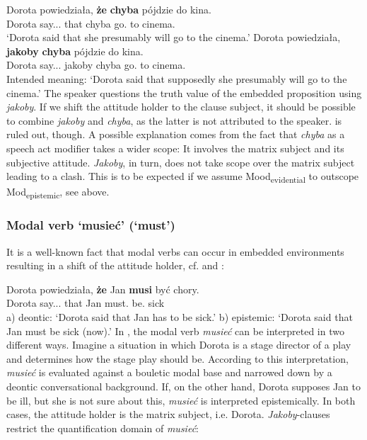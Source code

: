 \documentclass[output=paper
,modfonts
,nonflat]{langsci/langscibook}
\begin{document}
\ea \ea \gll	Dorota powiedziała, \textbf{że} \textbf{chyba} pójdzie do kina. \\
		Dorota say.{\lptcp}.{\sg}.{\fem} that chyba go.{\thirdperson}{\sg} to cinema.{\gen} \\
		\glt`Dorota said that she presumably will go to the cinema.' 
		\ex\gll	*Dorota powiedziała, \textbf{jakoby} \textbf{chyba} pójdzie do kina. \label{kanapka} \\
			Dorota say.{\lptcp}.{\sg}.{\fem} jakoby chyba go.{\thirdperson}{\sg} to cinema.{\gen} \\
		\glt Intended meaning: `Dorota said that supposedly she presumably will go to the cinema.'  
\z\z
The speaker questions the truth value of the embedded proposition using \emph{jakoby}. If we shift the attitude holder to the clause subject, it should be possible to combine \emph{jakoby} and \emph{chyba}, as the latter is not attributed to the speaker.  is ruled out, though. A possible explanation comes from the fact that \emph{chyba} as a speech act modifier takes a wider scope: It involves the matrix subject and its subjective attitude. \emph{Jakoby}, in turn, does not take scope over the matrix subject leading to a clash. This is to be expected if we assume Mood\textsubscript{evidential} to outscope Mod\textsubscript{epistemic}, see  above. 

\subsubsection{Modal verb `musieć' (`must')}
It is a well-known fact that modal verbs can occur in embedded environments resulting in a shift of the attitude holder, cf. \textcite{Hacquard2006} and \textcite{Hacquard-Wellwood2012}:  

\ea \gll Dorota powiedziała, \textbf{że} Jan \textbf{musi} być chory. \label{must} \\
		Dorota say.{\lptcp}.{\sg}.{\fem} that Jan must.{\thirdperson}{\sg} be.{\infv} sick \\
\glt	a) deontic: `Dorota said that Jan has to be sick.' 
\glt	b) epistemic: `Dorota said that Jan must be sick (now).'
\z   
In , the modal verb \emph{musieć} can be interpreted in two different ways. Imagine a situation in which Dorota is a stage director of a play and determines how the stage play should be. According to this interpretation, \emph{musieć} is evaluated against a bouletic modal base and narrowed down by a deontic conversational background. If, on the other hand, Dorota supposes Jan to be ill, but she is not sure about this, \emph{musieć} is interpreted epistemically. In both cases, the attitude holder is the matrix subject, i.e. Dorota. \emph{Jakoby}-clauses restrict the quantification domain of \emph{musieć}: 
 
\end{document}
